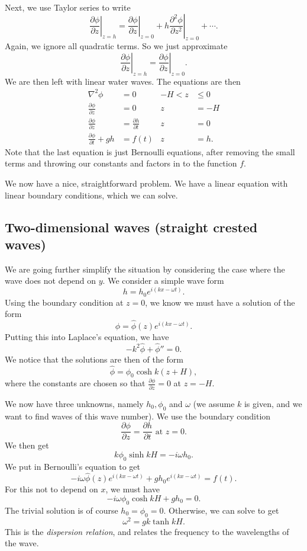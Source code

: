 \documentclass[a4paper]{article}
\begin{document}
Next, we use Taylor series to write
\[
  \left.\frac{\partial \phi}{\partial z}\right|_{z = h} = \left.\frac{\partial \phi}{\partial z}\right|_{z = 0} + h \left.\frac{\partial^2 \phi}{\partial z^2}\right|_{z = 0} + \cdots.
\]
Again, we ignore all quadratic terms. So we just approximate
\[
  \left.\frac{\partial \phi}{\partial z}\right|_{z = h} = \left.\frac{\partial \phi}{\partial z}\right|_{z = 0}.
\]
We are then left with linear water waves. The equations are then
\begin{align*}
  \nabla^2 \phi &= 0 & -H < z &\leq 0\\
  \frac{\partial \phi}{\partial z} &= 0 & z &= -H\\
  \frac{\partial \phi}{\partial z} &= \frac{\partial h}{\partial t} & z &= 0\\
  \frac{\partial \phi}{\partial t} + gh &= f(t) & z &= h.
\end{align*}
Note that the last equation is just Bernoulli equations, after removing the small terms and throwing our constants and factors in to the function $f$.

We now have a nice, straightforward problem. We have a linear equation with linear boundary conditions, which we can solve.

\subsection{Two-dimensional waves (straight crested waves)}
We are going further simplify the situation by considering the case where the wave does not depend on $y$. We consider a simple wave form
\[
  h = h_0 e^{i(kx - \omega t)}.
\]
Using the boundary condition at $z = 0$, we know we must have a solution of the form
\[
  \phi = \hat{\phi}(z) e^{i(kx - \omega t)}.
\]
Putting this into Laplace's equation, we have
\[
  -k^2 \hat{\phi} + \hat{\phi}'' = 0.
\]
We notice that the solutions are then of the form
\[
  \hat{\phi} = \phi_0 \cosh k(z + H),
\]
where the constants are chosen so that $\frac{\partial \phi}{\partial z} = 0$ at $z = -H$.

We now have three unknowns, namely $h_0, \phi_0$ and $\omega$ (we assume $k$ is given, and we want to find waves of this wave number). We use the boundary condition
\[
  \frac{\partial \phi}{\partial z} = \frac{\partial h}{\partial t}\text{ at }z = 0.
\]
We then get
\[
  k \phi_0 \sinh kH = -i \omega h_0.
\]
We put in Bernoulli's equation to get
\[
  -i\omega \hat{\phi}(z) e^{i(kx - \omega t)} + g h_0 e^{i(kx - \omega t)} = f(t).
\]
For this not to depend on $x$, we must have
\[
  -i\omega \phi_0 \cosh kH + gh_0 = 0.
\]
The trivial solution is of course $h_0 = \phi_0 = 0$. Otherwise, we can solve to get
\[
  \omega^2 = gk \tanh kH.
\]
This is the \emph{dispersion relation}, and relates the frequency to the wavelengths of the wave.
\end{document}
